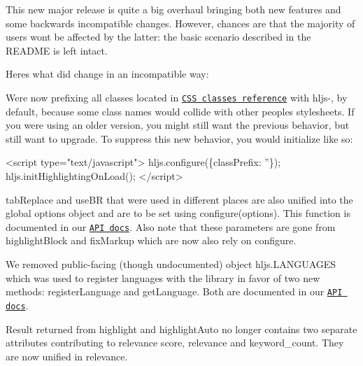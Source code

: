 This new major release is quite a big overhaul bringing both new features and some backwards incompatible changes. However, chances are that the majority of users won\textquotesingle{}t be affected by the latter\+: the basic scenario described in the R\+E\+A\+D\+ME is left intact.

Here\textquotesingle{}s what did change in an incompatible way\+:


\begin{DoxyItemize}
\item We\textquotesingle{}re now prefixing all classes located in \href{http://highlightjs.readthedocs.org/en/latest/css-classes-reference.html}{\tt C\+SS classes reference} with {\ttfamily hljs-\/}, by default, because some class names would collide with other people\textquotesingle{}s stylesheets. If you were using an older version, you might still want the previous behavior, but still want to upgrade. To suppress this new behavior, you would initialize like so\+:
\end{DoxyItemize}


\begin{DoxyCode}
<script type="text/javascript">
  hljs.configure(\{classPrefix: ''\});
  hljs.initHighlightingOnLoad();
</script>
\end{DoxyCode}



\begin{DoxyItemize}
\item {\ttfamily tab\+Replace} and {\ttfamily use\+BR} that were used in different places are also unified into the global options object and are to be set using {\ttfamily configure(options)}. This function is documented in our \href{http://highlightjs.readthedocs.org/en/latest/api.html}{\tt A\+PI docs}. Also note that these parameters are gone from {\ttfamily highlight\+Block} and {\ttfamily fix\+Markup} which are now also rely on {\ttfamily configure}.
\item We removed public-\/facing (though undocumented) object {\ttfamily hljs.\+L\+A\+N\+G\+U\+A\+G\+ES} which was used to register languages with the library in favor of two new methods\+: {\ttfamily register\+Language} and {\ttfamily get\+Language}. Both are documented in our \href{http://highlightjs.readthedocs.org/en/latest/api.html}{\tt A\+PI docs}.
\item Result returned from {\ttfamily highlight} and {\ttfamily highlight\+Auto} no longer contains two separate attributes contributing to relevance score, {\ttfamily relevance} and {\ttfamily keyword\+\_\+count}. They are now unified in {\ttfamily relevance}.
\end{DoxyItemize}

